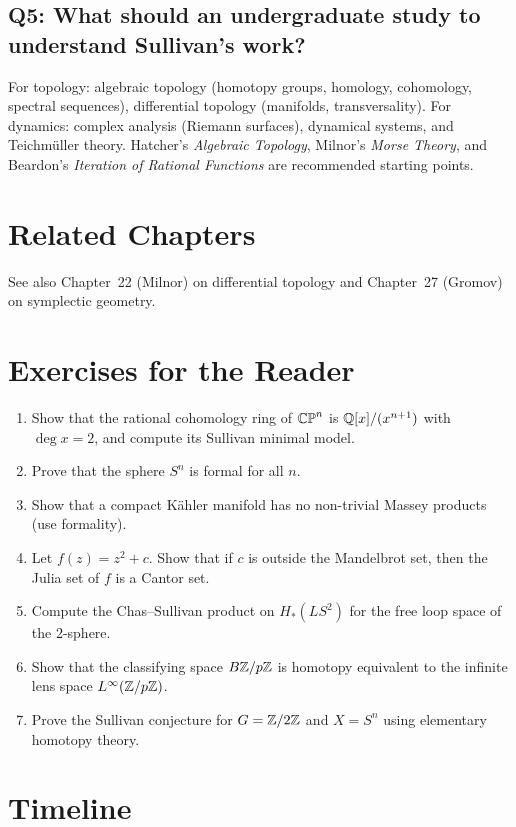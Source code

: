 \subsection*{Q5: What should an undergraduate study to understand Sullivan's work?}
For topology: algebraic topology (homotopy groups, homology, cohomology, spectral sequences), differential topology (manifolds, transversality). For dynamics: complex analysis (Riemann surfaces), dynamical systems, and Teichm\"uller theory. Hatcher's \textit{Algebraic Topology}, Milnor's \textit{Morse Theory}, and Beardon's \textit{Iteration of Rational Functions} are recommended starting points.

\section{Related Chapters}
See also Chapter~22 (Milnor) on differential topology and Chapter~27 (Gromov) on symplectic geometry.

\section*{Exercises for the Reader}

\begin{enumerate}
    \item [B] Show that the rational cohomology ring of $\mathbb{CP}^n$ is $\mathbb{Q}[x]/(x^{n+1})$ with $\deg x = 2$, and compute its Sullivan minimal model.
    \item [I] Prove that the sphere $S^n$ is formal for all $n$.
    \item [I] Show that a compact K\"ahler manifold has no non-trivial Massey products (use formality).
    \item [I] Let $f(z) = z^2 + c$. Show that if $c$ is outside the Mandelbrot set, then the Julia set of $f$ is a Cantor set.
    \item [A] Compute the Chas--Sullivan product on $H_*(LS^2)$ for the free loop space of the 2-sphere.
    \item [B] Show that the classifying space $B\mathbb{Z}/p\mathbb{Z}$ is homotopy equivalent to the infinite lens space $L^\infty(\mathbb{Z}/p\mathbb{Z})$.
    \item [A] Prove the Sullivan conjecture for $G = \mathbb{Z}/2\mathbb{Z}$ and $X = S^n$ using elementary homotopy theory.
\end{enumerate}

\section*{Timeline}

